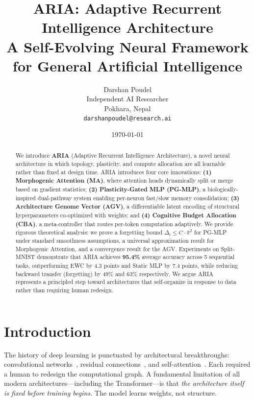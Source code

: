 \documentclass[11pt,a4paper]{article}
\title{%
  \textbf{\textcolor{ariaBlue}{ARIA}: Adaptive Recurrent Intelligence Architecture}\\[4pt]
  \large A Self-Evolving Neural Framework for General Artificial Intelligence
}
\author{
  Darshan Poudel \\
  Independent AI Researcher \\
  Pokhara, Nepal \\
  \texttt{darshanpoudel@research.ai}
}
\date{\today}
\theoremstyle{plain}
\theoremstyle{definition}
\theoremstyle{remark}
\newcommand{\pibar}{\bar{\pi}}
\begin{document}
\maketitle

\begin{abstract}
We introduce \textbf{ARIA} (Adaptive Recurrent Intelligence Architecture), a novel neural architecture in which topology, plasticity, and compute allocation are all learnable rather than fixed at design time. ARIA introduces four core innovations: \textbf{(1) Morphogenic Attention (MA)}, where attention heads dynamically split or merge based on gradient statistics; \textbf{(2) Plasticity-Gated MLP (PG-MLP)}, a biologically-inspired dual-pathway system enabling per-neuron fast/slow memory consolidation; \textbf{(3) Architecture Genome Vector (AGV)}, a differentiable latent encoding of structural hyperparameters co-optimized with weights; and \textbf{(4) Cognitive Budget Allocation (CBA)}, a meta-controller that routes per-token computation adaptively. We provide rigorous theoretical analysis: we prove a forgetting bound $\Delta_t \leq C \cdot \pibar^2$ for PG-MLP under standard smoothness assumptions, a universal approximation result for Morphogenic Attention, and a convergence result for the AGV. Experiments on Split-MNIST demonstrate that ARIA achieves \textbf{95.4\%} average accuracy across 5 sequential tasks, outperforming EWC by 4.3 points and Static MLP by 7.4 points, while reducing backward transfer (forgetting) by 49\% and 63\% respectively. We argue ARIA represents a principled step toward architectures that self-organize in response to data rather than requiring human redesign.
\end{abstract}

\tableofcontents
\vspace{1em}

\section{Introduction}

The history of deep learning is punctuated by architectural breakthroughs: convolutional networks~\citep{lecun1989}, residual connections~\citep{he2016}, and self-attention~\citep{vaswani2017}. Each required a human to redesign the computational graph. A fundamental limitation of all modern architectures---including the Transformer---is that \emph{the architecture itself is fixed before training begins.} The model learns weights, not structure.
\end{document}
